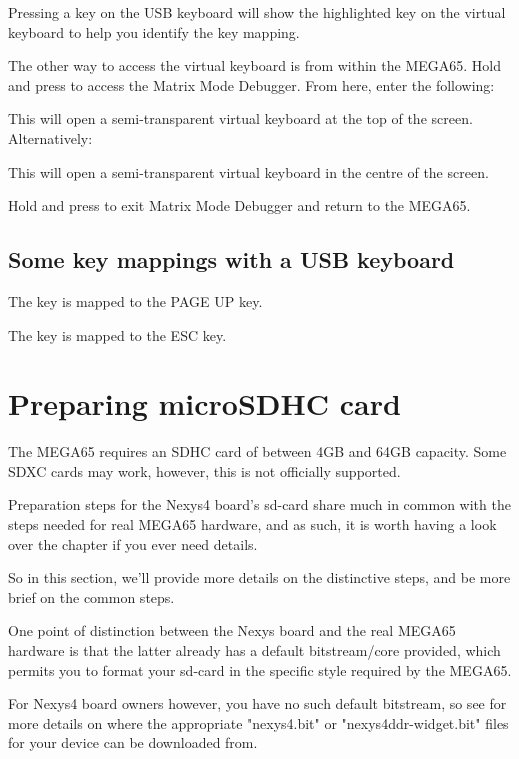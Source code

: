 Pressing a key on the USB keyboard will show the highlighted key on the virtual keyboard to help you identify the key mapping.

The other way to access the virtual keyboard is from within the MEGA65. Hold \megasymbolkey and press  to access the Matrix Mode Debugger. From here, enter the following:


This will open a semi-transparent virtual keyboard at the top of the screen. Alternatively:


This will open a semi-transparent virtual keyboard in the centre of the screen.

Hold \megasymbolkey and press  to exit Matrix Mode Debugger and return to the MEGA65.

\subsection{Some key mappings with a USB keyboard}

The  key is mapped to the PAGE UP key.

The   key is mapped to the ESC key.

\newpage

\section{Preparing microSDHC card}

The MEGA65 requires an SDHC card of between 4GB and 64GB capacity.  Some SDXC cards may work, however, this is not officially supported.

Preparation steps for the Nexys4 board's sd-card share much in common with the steps needed for real MEGA65 hardware, and as such, it is worth having a look over the  chapter if you ever need details. 

So in this section, we'll provide more details on the distinctive steps, and be more brief on the common steps.

One point of distinction between the Nexys board and the real MEGA65 hardware is that the latter already has a default bitstream/core provided, which permits you to format your sd-card in the specific style required by the MEGA65.

For Nexys4 board owners however, you have no such default bitstream, so
see  for more details on where the appropriate "nexys4.bit" or "nexys4ddr-widget.bit" files for your device can be downloaded from.

